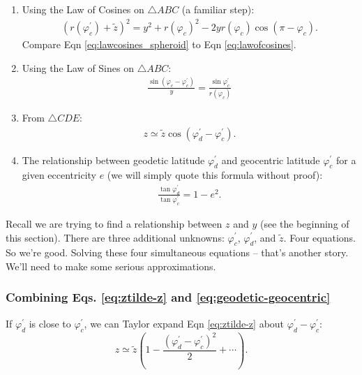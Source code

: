 \documentclass[10pt]{article}
\begin{document}
\begin{enumerate}

\item Using the Law of Cosines on $\bigtriangleup ABC$ (a familiar step):
\begin{align} \label{eq:lawcosines_spheroid}
(r(\varphi_c^{'}) + \tilde{z})^2 = y^2 + r(\varphi_c)^2 - 2y r(\varphi_c) \cos (\pi - \varphi_c).
\end{align}
Compare Eqn \eqref{eq:lawcosines_spheroid} to Eqn \eqref{eq:lawofcosines}.

\item Using the Law of Sines on $\bigtriangleup ABC$:
\begin{align} \label{eq:lawsines_spheroid}
\frac{\sin (\varphi_c - \varphi_c^{'})}{y} = \frac{\sin \varphi_c^{'}}{r(\varphi_c)}
\end{align}

\item From $\bigtriangleup CDE$:
\begin{align} \label{eq:ztilde-z}
z \simeq \tilde{z} \cos(\varphi_d^{'} - \varphi_c^{'}).
\end{align}

\item The relationship between geodetic latitude $\varphi_d^{'}$ and geocentric latitude $\varphi_c^{'}$ for a given eccentricity $e$ (we will simply quote this formula without proof):
\begin{align} \label{eq:geodetic-geocentric}
\frac{\tan \varphi_d^{'}}{\tan \varphi_c^{'}} = 1 - e^2.
\end{align}

\end{enumerate}

Recall we are trying to find a relationship between $z$ and $y$ (see the beginning of this section). There are three additional unknowns: $\varphi_c^{'}$, $\varphi_d^{'}$, and $\tilde{z}$. Four equations. So we're good. Solving these four simultaneous equations -- that's another story. We'll need to make some serious approximations.

\subsubsection{Combining Eqs. \eqref{eq:ztilde-z} and \eqref{eq:geodetic-geocentric}}

If $\varphi_d^{'}$ is close to $\varphi_c^{'}$, we can Taylor expand Eqn \eqref{eq:ztilde-z} about $\varphi_d^{'} - \varphi_c^{'}$:
$$
z \simeq \tilde{z} \left( 1-\frac{(\varphi_d^{'} - \varphi_c^{'})^2}{2} + \cdots \right).
$$
\end{document}
